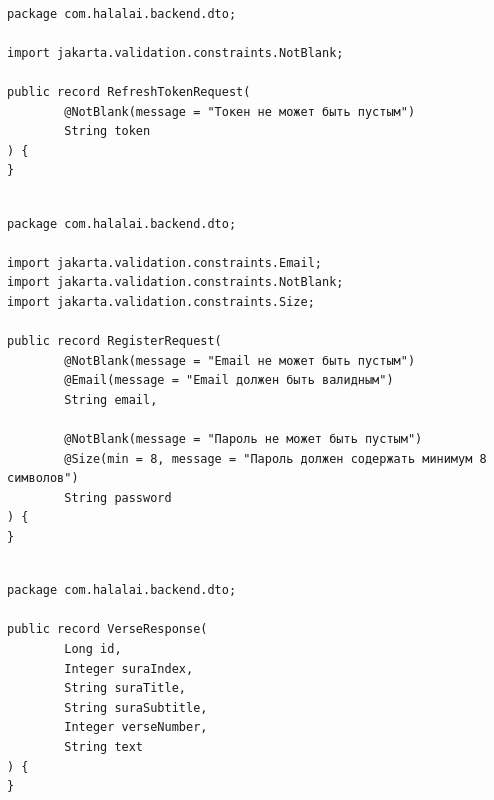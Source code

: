 \begin{lstlisting}[basicstyle=\tiny\ttfamily,breaklines=true]

package com.halalai.backend.dto;

import jakarta.validation.constraints.NotBlank;

public record RefreshTokenRequest(
        @NotBlank(message = "Токен не может быть пустым")
        String token
) {
}
\end{lstlisting}

\begin{lstlisting}[basicstyle=\tiny\ttfamily,breaklines=true]

package com.halalai.backend.dto;

import jakarta.validation.constraints.Email;
import jakarta.validation.constraints.NotBlank;
import jakarta.validation.constraints.Size;

public record RegisterRequest(
        @NotBlank(message = "Email не может быть пустым")
        @Email(message = "Email должен быть валидным")
        String email,

        @NotBlank(message = "Пароль не может быть пустым")
        @Size(min = 8, message = "Пароль должен содержать минимум 8 символов")
        String password
) {
}
\end{lstlisting}

\begin{lstlisting}[basicstyle=\tiny\ttfamily,breaklines=true]

package com.halalai.backend.dto;

public record VerseResponse(
        Long id,
        Integer suraIndex,
        String suraTitle,
        String suraSubtitle,
        Integer verseNumber,
        String text
) {
}
\end{lstlisting}


